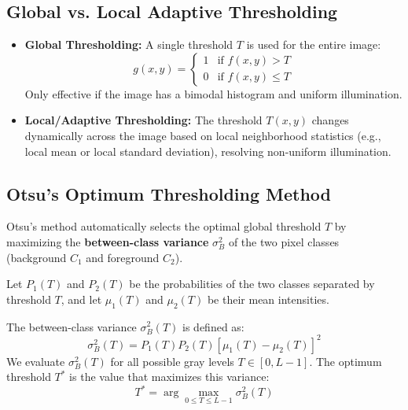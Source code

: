 \documentclass[12pt,a4paper]{article}
\begin{document}
\subsection{Global vs. Local Adaptive Thresholding}
\begin{itemize}[leftmargin=*, itemsep=3.5pt]
  \item \textbf{Global Thresholding:} A single threshold $T$ is used for the entire image:
    \begin{equation}
      g(x,y) = \begin{cases} 1 & \text{if } f(x,y) > T \\ 0 & \text{if } f(x,y) \le T \end{cases}
    \end{equation}
    Only effective if the image has a bimodal histogram and uniform illumination.
  \item \textbf{Local/Adaptive Thresholding:} The threshold $T(x,y)$ changes dynamically across the image based on local neighborhood statistics (e.g., local mean or local standard deviation), resolving non-uniform illumination.
\end{itemize}

\subsection{Otsu's Optimum Thresholding Method}
Otsu's method automatically selects the optimal global threshold $T$ by maximizing the \textbf{between-class variance} $\sigma_B^2$ of the two pixel classes (background $C_1$ and foreground $C_2$).

\begin{tcolorbox}[formulabox, title={Otsu's Formulation}]
Let $P_1(T)$ and $P_2(T)$ be the probabilities of the two classes separated by threshold $T$, and let $\mu_1(T)$ and $\mu_2(T)$ be their mean intensities.
\par\noindent
The between-class variance $\sigma_B^2(T)$ is defined as:
\begin{equation}
  \sigma_B^2(T) = P_1(T) P_2(T) \left[ \mu_1(T) - \mu_2(T) \right]^2
\end{equation}
We evaluate $\sigma_B^2(T)$ for all possible gray levels $T \in [0, L-1]$. The optimum threshold $T^*$ is the value that maximizes this variance:
\begin{equation}
  T^* = \arg\max_{0 \le T \le L-1} \sigma_B^2(T)
\end{equation}
\end{tcolorbox}
\end{document}
